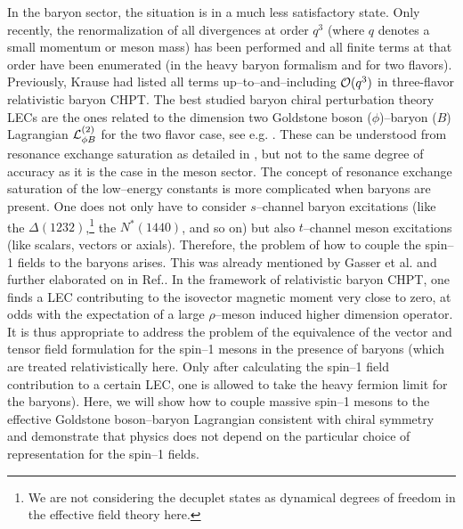 In the baryon sector, the situation is in a  much less satisfactory
state. Only recently, the renormalization of all divergences at order
$q^3$ (where $q$ denotes a small momentum or meson mass) has been
performed \cite{eckerr} and all finite terms at that order have been
enumerated \cite{eckmoj} (in the heavy baryon formalism and for two
flavors). Previously,
Krause \cite{krause} had listed all terms up--to--and--including
${\cal O}(q^3)$ in three-flavor relativistic baryon CHPT.
The best studied baryon chiral perturbation
theory LECs are the ones related to the dimension two Goldstone boson
($\phi$)--baryon ($B$) Lagrangian ${\cal L}_{\phi B}^{(2)}$ for the
two flavor case, see e.g. \cite{bkmrev,bkmpin,bkmppn}. These can be
understood from resonance exchange saturation as detailed in
\cite{ulfmit}, but not to the same degree of accuracy as it is the
case in the meson sector. The concept of resonance exchange saturation
of the low--energy constants is more complicated when baryons are
present. One does not only have to consider $s$--channel baryon
excitations (like the $\Delta (1232)$,\footnote{We are not considering
the decuplet states as dynamical degrees of freedom in the effective
field theory here.} the $N^* (1440)$, and so on) but also $t$--channel
meson excitations (like scalars, vectors or axials). Therefore, the
problem of how to couple the spin--1 fields to the baryons
arises. This was already mentioned by Gasser et al. \cite{gss} and
further elaborated on in Ref.\cite{ulfsea}. In the framework of
relativistic baryon CHPT, one finds a LEC contributing to the
isovector magnetic moment very close to zero, at odds with the
expectation of a large $\rho$--meson induced higher dimension
operator. It is thus appropriate to address the problem of the
equivalence of the vector and tensor field formulation for the spin--1
mesons in the presence of baryons (which are treated relativistically
here. Only after calculating the spin--1 field contribution to a
certain LEC, one is allowed to take the heavy fermion limit for the baryons).
Here, we will show how to couple massive spin--1 mesons to the
effective Goldstone boson--baryon Lagrangian consistent with chiral
symmetry and demonstrate that physics does not depend on the
particular choice of representation for the spin--1 fields.

